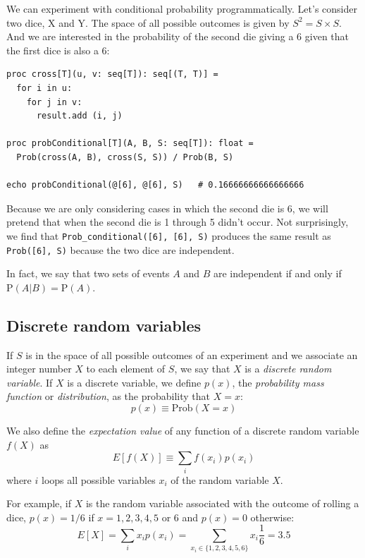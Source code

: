 \documentclass[justified, sixbynine]{tufte-book}
\def\ft{\small\tt}
\theoremstyle{plain}%
\newtheorem * {corollary}{Corollary}
\theoremstyle{definition}
\theoremstyle{remark}
\newtheorem * {remark}{Remark}
\newtheorem * {note}{Note}
\begin{document}
\begin{fullwidth}
We can experiment with conditional probability programmatically. Let's consider two dice, X and Y.
The space of all possible outcomes is given by $S^2 = S \times S$.
And we are interested in the probability of the second die giving a $6$ given that the first dice is also a $6$:

\begin{lstlisting}
proc cross[T](u, v: seq[T]): seq[(T, T)] =
  for i in u:
    for j in v:
      result.add (i, j)

proc probConditional[T](A, B, S: seq[T]): float =
  Prob(cross(A, B), cross(S, S)) / Prob(B, S)

echo probConditional(@[6], @[6], S)   # 0.16666666666666666
\end{lstlisting}

Because we are only considering cases in which the second die is 6, we will pretend that when the second die is 1 through 5 didn't occur.
Not surprisingly, we find that {\ft Prob\_conditional([6], [6], S)} produces the same result as
{\ft Prob([6], S)} because the two dice are independent.

In fact, we say that two sets of events $A$ and $B$ are independent if and only if $\textrm{P}(A|B) = \textrm{P}(A)$.

\goodbreak\subsection{Discrete random variables}

If $S$ is in the space of all possible outcomes of an experiment and we
associate an integer number $X$ to each element of $S$, we say that $X$ is a
{\it discrete random variable}. If $X$ is a discrete variable, we define $%
p(x)$, the {\it probability mass function} or {\it distribution}, as the
probability that $X=x$:
\begin{equation}
p(x) \equiv \textrm{Prob}(X=x)
\end{equation}

We also define the {\it expectation value} of any function of a discrete
random variable $f(X)$ as
\begin{equation}
E[f(X)] \equiv  \sum_i f(x_i)p(x_i)
\end{equation}
where $i$ loops all possible variables $x_i$ of the random variable $X$.

For example, if $X$ is the random variable associated with the outcome of rolling a dice, $p(x)=1/6$ if $x=1, 2, 3, 4, 5$ or $6$ and $p(x)=0$ otherwise:
\begin{equation}
E[X]=\sum_ix_ip(x_i)=\sum_{x_i\in \{1, 2, 3, 4, 5, 6\}}x_i\frac 16=3.5
\end{equation}


\end{fullwidth}
\end{document}
